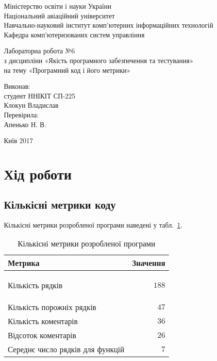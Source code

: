 \documentclass[a4paper,oneside,DIV=12,12pt]{scrartcl}
\begin{document}
	\begin{titlepage}
    \begin{center}
	Міністерство освіти і науки України\\
	Національний авіаційний університет\\
	Навчально-науковий інститут комп'ютерних інформаційних технологій\\
	Кафедра комп'ютеризованих систем управління

	\vspace{\fill}

	Лабораторна робота №6\\
	з дисципліни «Якість програмного забезпечення та тестування»\\
	на тему «Програмний код і його метрики»

	\vspace{\fill}
	
	\begin{flushright}
		Виконав:\\
		студент ННІКІТ СП-225\\
		Клокун Владислав\\
		Перевірила:\\
		Апенько Н. В.
	\end{flushright}

	Київ 2017

    \end{center}
    \end{titlepage}
	
	\section{Хід роботи}
		\subsection{Кількісні метрики коду}
			Кількісні метрики розробленої програми наведені у табл.~\ref{tab:quantitative-metrics}.
			
			\begin{longtable}[c]{lr}
				\toprule
					Метрика & Значення\\
				\midrule
				\endhead
				\bottomrule
				\caption{Кількісні метрики розробленої програми}
				\endfoot
				\label{tab:quantitative-metrics}
				
					Кількість рядків                 & $188$\\
					Кількість порожніх рядків        & $47$\\
					Кількість коментарів             & $36$\\
					Відсоток коментарів              & $26$\\
					Середнє число рядків для функцій & $7$\\
			\end{longtable}
		
\end{document}
